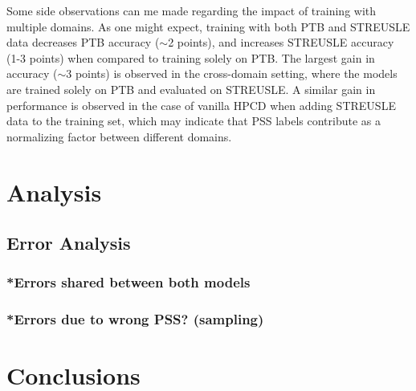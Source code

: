 Some side observations can me made regarding the impact of training with multiple domains. As one might expect, training with both PTB and STREUSLE data decreases PTB accuracy ($\sim$2 points), and increases STREUSLE accuracy (1-3 points) when compared to training solely on PTB. The largest gain in accuracy ($\sim$3 points) is observed in the cross-domain setting, where the models are trained solely on PTB and evaluated on STREUSLE. A similar gain in performance is observed in the case of vanilla HPCD when adding STREUSLE data to the training set, which may indicate that PSS labels contribute as a normalizing factor between different domains.

\section{Analysis}
\subsection{Error Analysis}
\subsubsection{*Errors shared between both models}
\subsubsection{*Errors due to wrong PSS? (sampling)}

\section{Conclusions}
